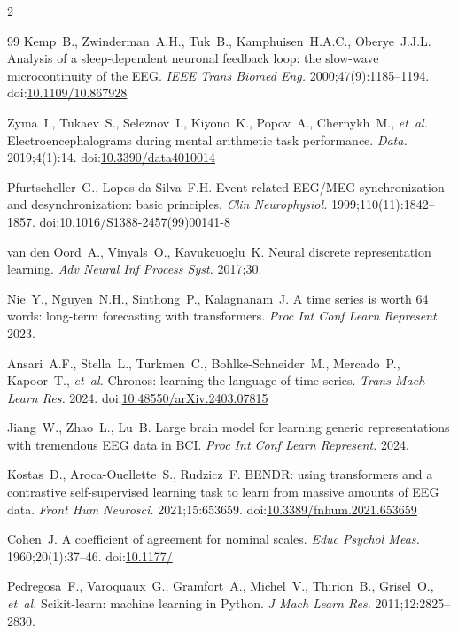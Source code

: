 \documentclass[14pt,a4paper]{extarticle}
\begin{document}
\begin{multicols}{2}
\begin{thebibliography}{99}
Kemp~B., Zwinderman~A.H., Tuk~B., Kamphuisen~H.A.C., Oberye~J.J.L.
Analysis of a sleep-dependent neuronal feedback loop: the slow-wave microcontinuity of the EEG.
\textit{IEEE Trans Biomed Eng.} 2000;47(9):1185--1194.
doi:\href{https://doi.org/10.1109/10.867928}{10.1109/10.867928}

Zyma~I., Tukaev~S., Seleznov~I., Kiyono~K., Popov~A., Chernykh~M., \textit{et~al.}
Electroencephalograms during mental arithmetic task performance.
\textit{Data.} 2019;4(1):14.
doi:\href{https://doi.org/10.3390/data4010014}{10.3390/data4010014}

Pfurtscheller~G., Lopes da Silva~F.H.
Event-related EEG/MEG synchronization and desynchronization: basic principles.
\textit{Clin Neurophysiol.} 1999;110(11):1842--1857.
doi:\href{https://doi.org/10.1016/S1388-2457(99)00141-8}{10.1016/S1388-2457(99)00141-8}


van den Oord~A., Vinyals~O., Kavukcuoglu~K.
Neural discrete representation learning.
\textit{Adv Neural Inf Process Syst.} 2017;30.

Nie~Y., Nguyen~N.H., Sinthong~P., Kalagnanam~J.
A time series is worth 64 words: long-term forecasting with transformers.
\textit{Proc Int Conf Learn Represent.} 2023.

Ansari~A.F., Stella~L., Turkmen~C., Bohlke-Schneider~M., Mercado~P., Kapoor~T.,
\textit{et~al.}
Chronos: learning the language of time series.
\textit{Trans Mach Learn Res.} 2024.
doi:\href{https://doi.org/10.48550/arXiv.2403.07815}{10.48550/arXiv.2403.07815}

Jiang~W., Zhao~L., Lu~B.
Large brain model for learning generic representations with tremendous EEG data in BCI.
\textit{Proc Int Conf Learn Represent.} 2024.

Kostas~D., Aroca-Ouellette~S., Rudzicz~F.
BENDR: using transformers and a contrastive self-supervised learning task to learn
from massive amounts of EEG data.
\textit{Front Hum Neurosci.} 2021;15:653659.
doi:\href{https://doi.org/10.3389/fnhum.2021.653659}{10.3389/fnhum.2021.653659}

Cohen~J.
A coefficient of agreement for nominal scales.
\textit{Educ Psychol Meas.} 1960;20(1):37--46.
doi:\href{https://doi.org/10.1177/001316446002000104}{10.1177/}

Pedregosa~F., Varoquaux~G., Gramfort~A., Michel~V., Thirion~B., Grisel~O., \textit{et~al.}
Scikit-learn: machine learning in Python.
\textit{J Mach Learn Res.} 2011;12:2825--2830.


\end{thebibliography}
\end{multicols}
\end{document}
